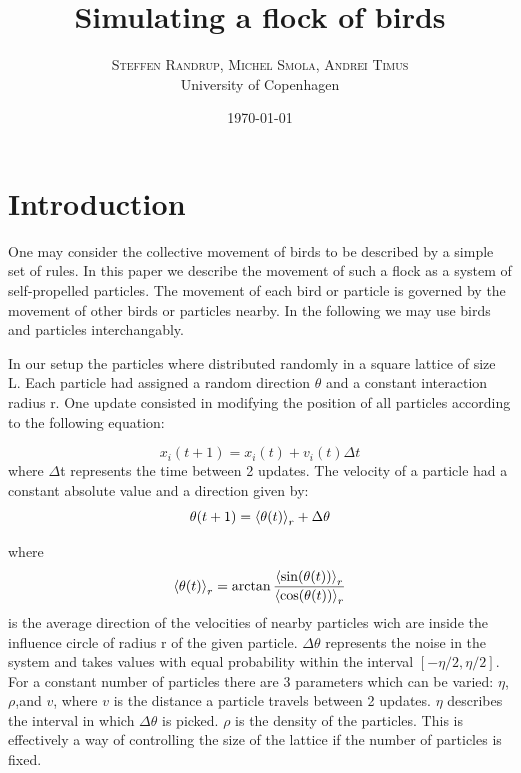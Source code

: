 \documentclass[twoside,twocolumn]{article}
\title{Simulating a flock of birds} %
\author{%
\textsc{Steffen Randrup, Michel Smola, Andrei Timus}\\[1ex] %
\normalsize University of Copenhagen \\ %
}
\date{\today} %
\begin{document}
\maketitle


\section{Introduction}

One may consider the collective movement of birds to be described by a simple set of rules. In this paper we describe the movement of such a flock as a system of self-propelled particles. The movement of each bird or particle is governed by the movement of other birds or particles nearby. In the following we may use birds and particles interchangably.

In our setup the particles where distributed randomly in a square lattice of size L. Each particle had assigned a random direction $\theta$ and a constant interaction radius r. One update consisted in modifying the position of all particles according to the following equation:

\begin{equation}
x_{i}(t+1)=x_i(t)+v_i(t)\Delta t
\end{equation}
where $\Delta$t represents the time between 2 updates.
The velocity of a particle had a constant absolute value and a direction given by:
\begin{equation}
\theta(t+1)=\braket{\theta(t)}_r+\Delta \theta
\end{equation} 

where 
\begin{equation}
\braket{\theta(t)}_r=\arctan\frac{\braket{\sin(\theta(t))}_r}{\braket{\cos(\theta(t))}_r}
\end{equation}
is the average direction of the velocities of nearby particles wich are inside the influence circle of radius r of the given particle. $\Delta \theta$ represents the noise in the system and takes values with equal probability within the interval $[-\eta/2,\eta/2]$. For a constant number of particles there are 3 parameters which can be varied: $\eta$,$\rho$,and $v$, where $v$ is the distance a particle travels between 2 updates. $\eta$ describes the interval in which $\Delta\theta$ is picked. $\rho$ is the density of the particles. This is effectively a way of controlling the size of the lattice if the number of particles is fixed.
\end{document}
